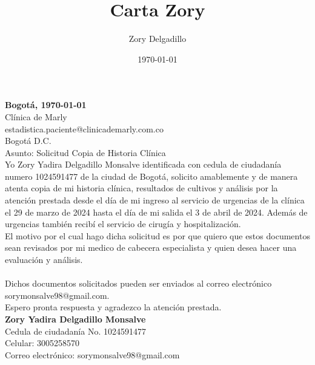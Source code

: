 \documentclass[12pt]{article}
\title{Carta Zory}
\author{Zory Delgadillo}
\date{\today}
\begin{document}
\begin{titlepage}
    \textbf{Bogotá, \today}\\[0.75in]
    Clínica de Marly\\
    estadistica.paciente@clinicademarly.com.co\\
    Bogotá D.C.\\[1in] 
    Asunto: Solicitud Copia de Historia Clínica\\[0.75in]
    Yo Zory Yadira Delgadillo Monsalve identificada con cedula de ciudadanía numero 1024591477 de la ciudad de Bogotá,
    solicito amablemente y de manera atenta copia de mi historia clínica, resultados de cultivos y análisis por la atención prestada desde el día 
    de mi ingreso al servicio de urgencias de la clínica el 29 de marzo de 2024 hasta el día de mi salida el 3 de abril de 2024. 
    Además de urgencias también recibí el servicio de cirugía y hospitalización.\\
    El motivo por el cual hago dicha solicitud es por que quiero que estos documentos sean revisados por mi medico de cabecera especialista
    y quien desea hacer una evaluación y análisis.\\
    \\
    Dichos documentos solicitados pueden ser enviados al correo electrónico sorymonsalve98@gmail.com.\\[0.5in]
    Espero pronta respuesta y agradezco la atención prestada.\\[2in]
    \textbf{Zory Yadira Delgadillo Monsalve}\\
    Cedula de ciudadanía No. 1024591477\\
    Celular: 3005258570\\
    Correo electrónico: sorymonsalve98@gmail.com\\
\end{titlepage}
\end{document}
